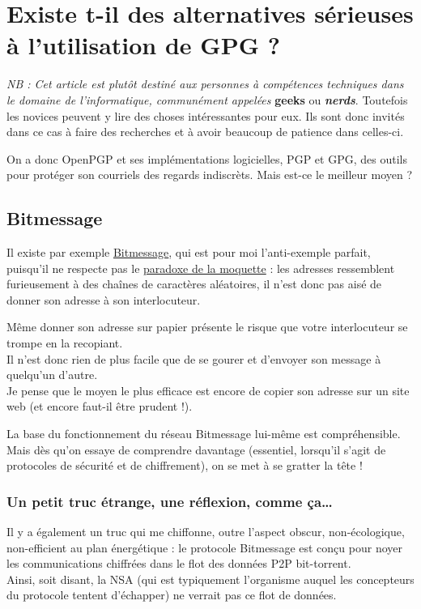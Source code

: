 \chapter{Existe t-il des alternatives sérieuses à l'utilisation de GPG ?}

\emph{NB : Cet article est plutôt destiné aux personnes à compétences
techniques dans le domaine de l'informatique, communément appelées
}\textbf{geeks} ou \textbf{\emph{nerds}}. Toutefois les novices peuvent
y lire des choses intéressantes pour eux. Ils sont donc invités dans ce
cas à faire des recherches et à avoir beaucoup de patience dans
celles-ci.

On a donc OpenPGP et ses implémentations logicielles, PGP et GPG, des
outils pour protéger son courriels des regards indiscrèts. Mais est-ce
le meilleur moyen ?

\section{Bitmessage}\label{bitmessage}

Il existe par exemple
\href{http://www.bortzmeyer.org/bitmessage.html}{Bitmessage}, qui est
pour moi l'anti-exemple parfait, puisqu'il ne respecte pas le
\href{\{filename\}../Informatics/paradoxe-moquette-fr.md}{paradoxe de la
moquette} : les adresses ressemblent furieusement à des chaînes de
caractères aléatoires, il n'est donc pas aisé de donner son adresse à
son interlocuteur.

Même donner son adresse sur papier présente le risque que votre
interlocuteur se trompe en la recopiant.\\Il n'est donc rien de plus
facile que de se gourer et d'envoyer son message à quelqu'un
d'autre.\\Je pense que le moyen le plus efficace est encore de copier
son adresse sur un site web (et encore faut-il être prudent !).

La base du fonctionnement du réseau Bitmessage lui-même est
compréhensible. Mais dès qu'on essaye de comprendre davantage
(essentiel, lorsqu'il s'agit de protocoles de sécurité et de
chiffrement), on se met à se gratter la tête !

\subsection{Un petit truc étrange, une réflexion, comme ça\ldots{}}\label{un-petit-truc-uxe9trange-une-ruxe9flexion-comme-uxe7a}

Il y a également un truc qui me chiffonne, outre l'aspect obscur,
non-écologique, non-efficient au plan énergétique : le protocole
Bitmessage est conçu pour noyer les communications chiffrées dans le
flot des données P2P bit-torrent.\\Ainsi, soit disant, la NSA (qui est
typiquement l'organisme auquel les concepteurs du protocole tentent
d'échapper) ne verrait pas ce flot de données.

